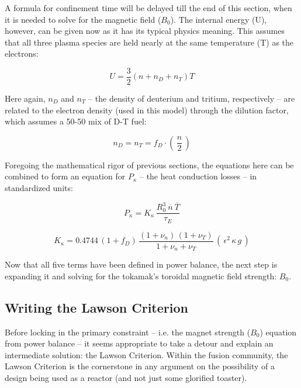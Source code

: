 A formula for confinement time will be delayed till the end of this section, when it is needed to solve for the magnetic field ($B_0$). The internal energy (U), however, can be given now as it has its typical physics meaning. This assumes that all three plasma species are held nearly at the same temperature (T) as the electrons:

\begin{equation}
	U = \frac{3}{2} \left( n + n_D + n_T \right) T
\end{equation}

Here again, $n_D$ and $n_T$ -- the density of deuterium and tritium, respectively -- are related to the electron density (used in this model) through the dilution factor, which assumes a 50-50 mix of D-T fuel:

\begin{equation}
	n_D = n_T = f_D \cdot \left( \, \frac{n}{2} \, \right)
\end{equation}

Foregoing the mathematical rigor of previous sections, the equations here can be combined to form an equation for $P_\kappa$ -- the heat conduction losses -- in standardized units:

\begin{equation}
	\label{eq:pkappa}
	P_\kappa = K_\kappa \, \frac{ R_0 ^ 3 \ \overline{n}  \ \overline{T}  }{\tau_E} 
\end{equation}

\begin{equation}
	K_\kappa = 0.4744 \, ( 1 + f_D ) \, \frac{ (1 + \nu_n) \, (1 + \nu_T) }{1 + \nu_n + \nu_T } \, ( \, \epsilon^2 \, \kappa \, g \, )
\end{equation}

Now that all five terms have been defined in power balance, the next step is expanding it and solving for the tokamak's toroidal magnetic field strength: $B_0$.

\subsection{Writing the Lawson Criterion}

Before locking in the primary constraint -- i.e. the magnet strength ($B_0$) equation from power balance -- it seems appropriate to take a detour and explain an intermediate solution: the Lawson Criterion. Within the fusion community, the Lawson Criterion is the cornerstone in any argument on the possibility of a design being used as a reactor (and not just some glorified toaster). 

